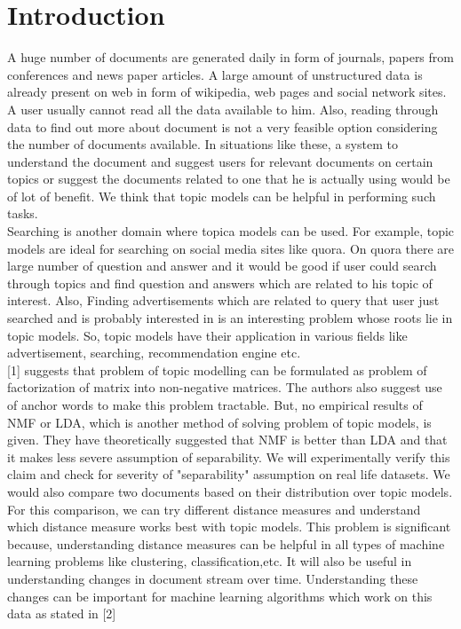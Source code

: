 \documentclass[a4paper,11pt]{article}
\begin{document}
\pagebreak

\section{Introduction}
A huge number of documents are generated daily in form of journals, papers from conferences and  news paper articles. A large amount of unstructured data is already present on web in form of wikipedia, web pages and social network sites. A user usually cannot read all the data available to him. Also, reading through data to find out more about document is not a very feasible option considering the number of documents available. In situations like these, a system to understand the document and suggest users for relevant documents on certain topics or suggest the documents related to one that he is actually using would be of lot of benefit. We think that topic models can be helpful in performing such tasks. \\

Searching is another domain where topica models can be used. For example, topic models are ideal for searching on social media sites like quora. On quora there are large number of question and answer and it would be good if user could search through topics and find question and answers which are related to his topic of interest. Also, Finding advertisements which are related to query that user just searched and is probably interested in is an interesting problem whose roots lie in topic models. So, topic models have their application in various fields like advertisement, searching, recommendation engine etc. \\

[1] suggests that problem of topic modelling can be formulated as problem of factorization of matrix into non-negative matrices. The authors also suggest use of anchor words to make this problem tractable. But, no empirical results of NMF or LDA, which is another method of solving problem of topic models, is given. They have theoretically suggested that NMF is better than LDA and that it makes less severe assumption of separability. We will experimentally verify this claim and check for severity of "separability" assumption on real life datasets. We would also compare two documents based on their distribution over topic models. For this comparison, we can try different distance measures and understand which distance measure works best with topic models. This problem is significant because, understanding distance measures can be helpful in all types of machine learning problems like clustering, classification,etc. It will also be useful in understanding changes in document stream over time. Understanding these changes can be important for machine learning algorithms which work on this data as stated in [2]
\end{document}
